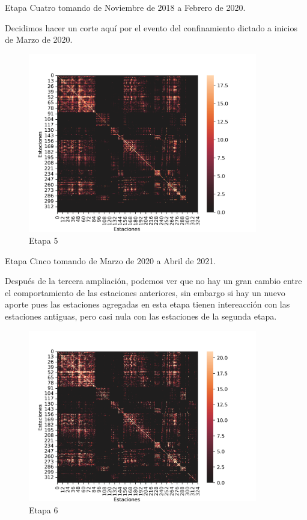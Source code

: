 \documentclass[
]{article}
\begin{document}
Etapa Cuatro tomando de Noviembre de 2018 a Febrero de 2020.

Decidimos hacer un corte aquí por el evento del confinamiento dictado a
inicios de Marzo de 2020.

\newpage
\begin{figure}[h]
\centering
\includegraphics[width=10cm]{../plots/resultsCinco.png}
\caption{Etapa 5}
\end{figure}

Etapa Cinco tomando de Marzo de 2020 a Abril de 2021.

Después de la tercera ampliación, podemos ver que no hay un gran cambio
entre el comportamiento de las estaciones anteriores, sin embargo si hay
un nuevo aporte pues las estaciones agregadas en esta etapa tienen
intereacción con las estaciones antiguas, pero casi nula con las
estaciones de la segunda etapa.

\newpage
\begin{figure}[h]
\centering
\includegraphics[width=10cm]{../plots/resultsSeis.png}
\caption{Etapa 6}
\end{figure}
\end{document}
